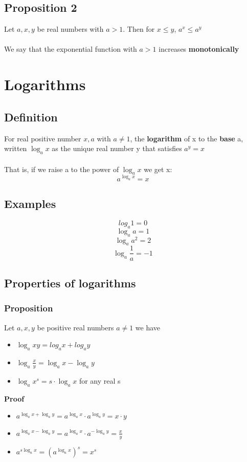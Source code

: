 \documentclass{article}[18pt]
\begin{document}
\subsection{Proposition 2}
Let $a,x,y$ be real numbers with $a>1$. Then for $x\leqslant y$, $a^x\leqslant a^y$\\
\\
We say that the exponential function with $a>1$ increases \textbf{monotonically}
\section{Logarithms}
\subsection{Definition}
For real positive number $x,a$ with $a\neq 1$, the \textbf{logarithm} of x to the \textbf{base} a, written $\log_ax$ as the unique real number y that satisfies $a^y=x$\\
\\
That is, if we raise a to the power of $\log_ax$ we get x:
{\large$$a^{\log_ax}=x$$}
\subsection{Examples}
$$log_a1=0$$
$$\log_aa=1$$
$$\log_aa^2=2$$
$$\log_a\frac{1}{a}=-1$$
\subsection{Properties of logarithms}
\subsubsection{Proposition}
Let $a,x,y$ be positive real numbers $a\neq 1$ we have
\begin{itemize}
	\item $\log_axy=log_ax+log_ay$
	\item $\log_a\frac{x}{y}=\log_ax-\log_ay$
	\item $\log_ax^s=s\cdot \log_ax$ for any real s
\end{itemize}
\textbf{Proof}
{\large
\begin{itemize}
	\item $a^{\log_ax+\log_ay}=a^{\log_ax}\cdot a^{\log_ay}=x\cdot y$
	\item $a^{\log_ax-\log_ay}=a^{\log_ax}\cdot a^{-\log_ay}=\frac{x}{y}$
	\item $a^{s\log_ax}=(a^{\log_ax})^s=x^s$
\end{itemize}}
\end{document}
